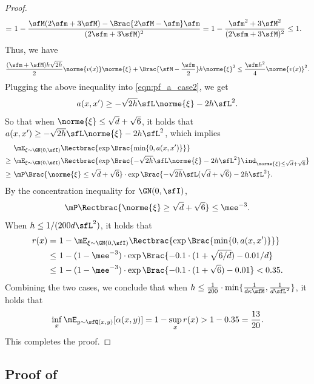 \documentclass[11pt]{article}
\begin{document}
\begin{proof}
\begin{align*}
    =~& 1 - \frac{ \sfM (2\sfm+3\sfM) -  \Brac{ 2 \sfM - \sfm } \sfm }{(2\sfm+3\sfM)^2} = 1 - \frac{\sfm^2+3\sfM^2}{(2\sfm+3\sfM)^2} \le 1.
\end{align*}
Thus, we have
\[
    \frac{(\sfm+\sfM) h\sqrt{2h}}{2} \norme{v(x)} \norme{\xi} + \Brac{ \sfM - \frac{\sfm}{2}  } h \norme{\xi}^2 \le \frac{\sfm h^2}{4} \norme{v(x)}^2.
\]
Plugging the above inequality into \eqref{eqn:pf_a_case2}, we get
\[
    a(x,x') \ge - \sqrt{2h} \sfL \norme{\xi} - 2 h \sfL^2.
\]
%
So that when $\norme{\xi} \le \sqrt{d} + \sqrt{6} $, it holds that $a(x,x') \ge - \sqrt{2h} \sfL \norme{\xi} - 2 h \sfL^2$, which implies
\begin{align*}
    &\mE_{\xi\sim \GN(0,\sfI)} \Rectbrac{ \exp \Brac{ \min \{ 0, a(x,x') \} } } \\
    \ge~& \mE_{\xi\sim \GN(0,\sfI)} \Rectbrac{ \exp \Brac{ - \sqrt{2h} \sfL \norme{\xi} - 2 h \sfL^2 } \ind_{\norme{\xi} \le \sqrt{d} + \sqrt{6}} } \\
    \ge~& \mP \Brac{ \norme{\xi} \le \sqrt{d} + \sqrt{6} } \cdot \exp \Brac{ - \sqrt{2h} \sfL ( \sqrt{d} + \sqrt{6} ) - 2 h \sfL^2 }.
\end{align*}
By the concentration inequality for $\GN(0,\sfI)$,
\[
    \mP \Rectbrac{ \norme{\xi} \ge \sqrt{d} + \sqrt{6} } \le \mee^{-3}.
\]
When $h \le 1/(200 d\sfL^2)$, it holds that
\begin{align*}
    r(x) =~& 1 - \mE_{\xi\sim \GN(0,\sfI)} \Rectbrac{ \exp \Brac{ \min \{ 0, a(x,x') \} } } \\
    \le~& 1 - (1-\mee^{-3}) \cdot \exp \Brac{ - 0.1 \cdot ( 1 + \sqrt{6/d} ) - 0.01/d} \\
    \le~& 1 - (1-\mee^{-3}) \cdot \exp \Brac{ - 0.1 \cdot ( 1 + \sqrt{6} ) - 0.01 } < 0.35. 
\end{align*}
Combining the two cases, we conclude that when $h \le \frac{1}{200} \cdot \min \{ \frac{1}{d\kappa \sfM} , \frac{1}{d\sfL^2} \} $, it holds that
\[
    \inf_x \mE_{y \sim \sfQ(x,y)} [\alpha(x,y)] = 1 - \sup_x r(x) > 1 - 0.35 = \frac{13}{20}.
\]
This completes the proof.
\end{proof}




\subsection{Proof of \texorpdfstring{}{Lemma \ref{lem:CloseCoupleMALA}}}
\label{app:pf_CloseCoupleMALA}
\end{document}
